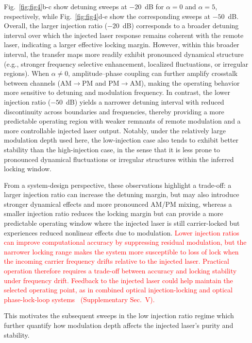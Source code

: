 \documentclass[%
 aip,
 apl,
 amsmath,amssymb,
 reprint,%
 floatfix,
]{revtex4-1}
\begin{document}
Fig.~\ref{fig:fig4}b-c show detuning sweeps at $-20$~dB for $\alpha=0$ and $\alpha=5$, respectively, while Fig.~\ref{fig:fig4}d-e show the corresponding sweeps at $-50$~dB. Overall, the larger injection ratio ($-20$~dB) corresponds to a broader detuning interval over which the injected laser response remains coherent with the remote laser, indicating a larger effective locking margin. However, within this broader interval, the transfer maps more readily exhibit pronounced dynamical structure (e.g., stronger frequency selective enhancement, localized fluctuations, or irregular regions). When $\alpha\neq 0$, amplitude--phase coupling can further amplify crosstalk between channels (AM$\to$PM and PM$\to$AM), making the operating behavior more sensitive to detuning and modulation frequency. In contrast, the lower injection ratio ($-50$~dB) yields a narrower detuning interval with reduced discontinuity across boundaries and frequencies, thereby providing a more predictable operating region with weaker remnants of remote modulation and a more controllable injected laser output. Notably, under the relatively large modulation depth used here, the low-injection case also tends to exhibit better stability than the high-injection case, in the sense that it is less prone to pronounced dynamical fluctuations or irregular structures within the inferred locking window.

From a system-design perspective, these observations highlight a trade-off: a larger injection ratio can increase the detuning margin, but may also introduce stronger dynamical effects and more pronounced AM/PM mixing, whereas a smaller injection ratio reduces the locking margin but can provide a more predictable operating window where the injected laser is still carrier-locked but experiences reduced nonlinear effects due to modulation.
\textcolor{red}{Lower injection ratios can improve computational accuracy by suppressing residual modulation, but the narrower locking range makes the system more susceptible to loss of lock when the incoming carrier frequency drifts relative to the injected laser. Practical operation therefore requires a trade-off between accuracy and locking stability under frequency drift. Feedback to the injected laser could help maintain the selected operating point, as in combined optical injection-locking and optical phase-lock-loop systems~\cite{Bordonalli1999OIPLL} (Supplementary Sec.~V).}

This motivates the subsequent sweeps in the low injection ratio regime which further quantify how modulation depth affects the injected laser's purity and stability.
\end{document}
